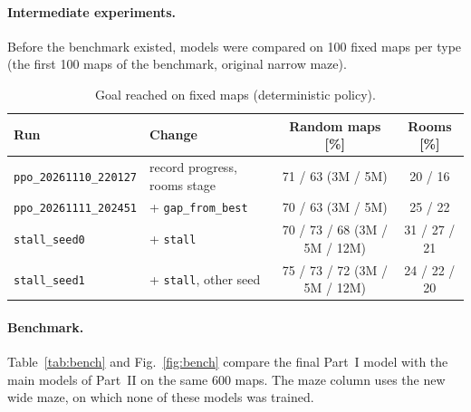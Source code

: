 \documentclass[11pt,a4paper]{article}
\newcommand{\code}[1]{\texttt{#1}}
\begin{document}
\paragraph{Intermediate experiments.} Before the benchmark existed, models were compared on 100 fixed maps per type
(the first 100 maps of the benchmark, original narrow maze).

\begin{table}[H]
      \centering\small
      \begin{tabular}{@{}l l c c@{}}
            \toprule
            Run                          & Change                       & Random maps [\%]             & Rooms [\%]   \\
            \midrule
            \code{ppo\_20261110\_220127} & record progress, rooms stage & 71 / 63 (3M / 5M)            & 20 / 16      \\
            \code{ppo\_20261111\_202451} & + \code{gap\_from\_best}     & 70 / 63 (3M / 5M)            & 25 / 22      \\
            \code{stall\_seed0}          & + \code{stall}               & 70 / 73 / 68 (3M / 5M / 12M) & 31 / 27 / 21 \\
            \code{stall\_seed1}          & + \code{stall}, other seed   & 75 / 73 / 72 (3M / 5M / 12M) & 24 / 22 / 20 \\
            \bottomrule
      \end{tabular}
      \caption{Goal reached on fixed maps (deterministic policy).}
      \label{tab:experiments}
\end{table}

\paragraph{Benchmark.} Table~\ref{tab:bench} and Fig.~\ref{fig:bench} compare the final Part~I model
with the main models of Part~II on the same 600 maps. The maze column uses the
new wide maze, on which none of these models was trained.
\end{document}
